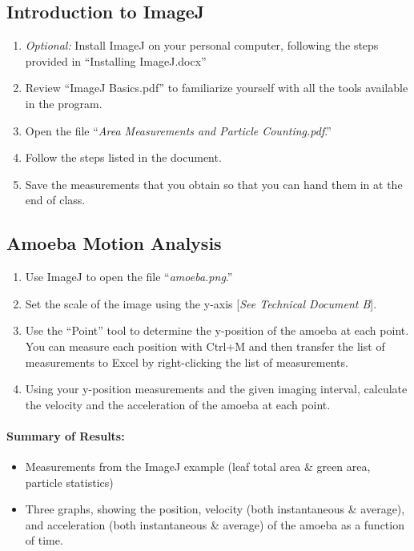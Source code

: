 \subsection{Introduction to ImageJ}
\begin{enumerate}
\item \emph{Optional:} Install ImageJ on your personal computer, following the steps provided in ``Installing ImageJ.docx''
\item Review ``ImageJ Basics.pdf'' to familiarize yourself with all the tools available in the program.
\item Open the file ``\textit{Area Measurements and Particle Counting.pdf}.''
\item Follow the steps listed in the document.
\item Save the measurements that you obtain so that you can hand them in at the end of class.
\end{enumerate}

\subsection{Amoeba Motion Analysis}
\begin{enumerate}
\item Use ImageJ to open the file ``\textit{amoeba.png}.''
\item Set the scale of the image using the y-axis [\textit{See Technical Document B}].
\item Use the ``Point'' tool to determine the y-position of the amoeba at each point.
You can measure each position with Ctrl+M and then transfer the list of measurements to Excel by right-clicking the list of measurements.
\item Using your y-position measurements and the given imaging interval, calculate the velocity and the acceleration of the amoeba at each point. 
\end{enumerate}

\paragraph{ Summary of Results:}
\begin{itemize}
\item Measurements from the ImageJ example (leaf total area \& green area, particle statistics)
\item Three graphs, showing the position, velocity (both instantaneous \& average), and acceleration (both instantaneous \& average) of the amoeba as a function of time.
\end{itemize}

